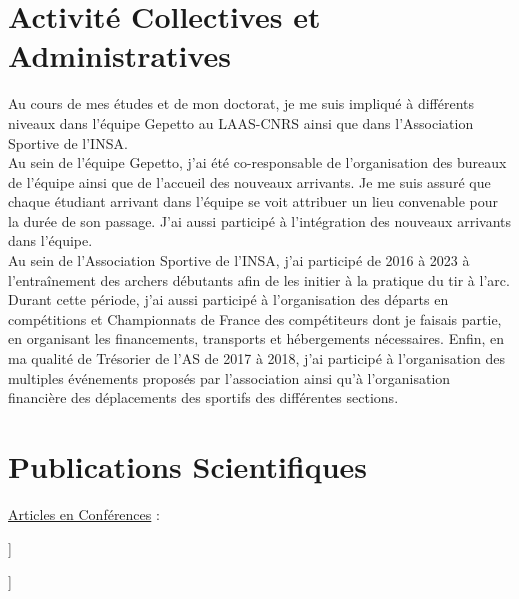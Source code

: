 \documentclass[11pt,a4paper,sans]{moderncv}         %
\begin{document}
\section{Activit\'e Collectives et Administratives}
Au cours de mes \'etudes et de mon doctorat, je me suis impliqu\'e \`a diff\'erents niveaux dans l'\'equipe Gepetto au LAAS-CNRS ainsi que dans l'Association Sportive de l'INSA.\\
Au sein de l'\'equipe Gepetto, j'ai \'et\'e co-responsable de l'organisation des bureaux de l'\'equipe ainsi que de l'accueil des nouveaux arrivants.
Je me suis assur\'e que chaque \'etudiant arrivant dans l'\'equipe se voit attribuer un lieu convenable pour la dur\'ee de son passage.
J'ai aussi particip\'e \`a l'int\'egration des nouveaux arrivants dans l'\'equipe.\\
Au sein de l'Association Sportive de l'INSA, j'ai particip\'e de 2016 \`a 2023 \`a l'entra\^inement des archers d\'ebutants afin de les initier \`a la pratique du tir \`a l'arc.
Durant cette p\'eriode, j'ai aussi particip\'e \`a l'organisation des d\'eparts en comp\'etitions et Championnats de France des comp\'etiteurs dont je faisais partie, en organisant les financements, transports et h\'ebergements n\'ecessaires.
Enfin, en ma qualit\'e de Tr\'esorier de l'AS de 2017 \`a 2018, j'ai particip\'e \`a l'organisation des multiples \'ev\'enements propos\'es par l'association ainsi qu'\`a l'organisation financi\`ere des d\'eplacements des sportifs des diff\'erentes sections.\\
%

\section{Publications Scientifiques}
\toggletrue{myrefs}
\large{\underline{Articles en Conf\'erences} :}
\begin{itemize}%
\normalsize{\item[[1]\hspace{-2mm}]} \normalsize{}
\normalsize{\item[[2]\hspace{-2mm}]} \normalsize{}
\end{itemize}

\newsavebox\mytempbib
\savebox\mytempbib{\parbox{\textwidth}{}}

\end{document}
